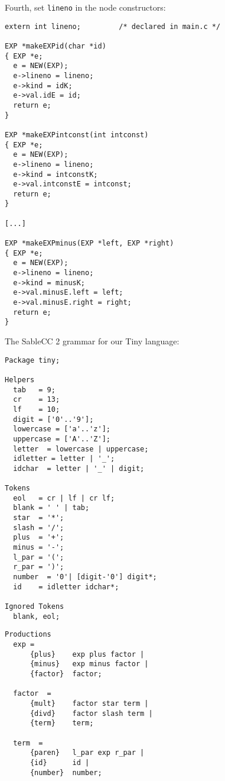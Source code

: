 \begin{slide*}
Fourth, set {\tt lineno} in the node constructors:
 
\begin{scriptsize}
\begin{verbatim}
extern int lineno;         /* declared in main.c */
 
EXP *makeEXPid(char *id)
{ EXP *e;
  e = NEW(EXP);
  e->lineno = lineno;
  e->kind = idK;
  e->val.idE = id;
  return e;
}
 
EXP *makeEXPintconst(int intconst)
{ EXP *e;
  e = NEW(EXP);
  e->lineno = lineno;
  e->kind = intconstK;
  e->val.intconstE = intconst;
  return e;
}

[...]

EXP *makeEXPminus(EXP *left, EXP *right)
{ EXP *e;
  e = NEW(EXP);
  e->lineno = lineno;
  e->kind = minusK;
  e->val.minusE.left = left;
  e->val.minusE.right = right;
  return e;
}
\end{verbatim}
\end{scriptsize}
\vfil
\end{slide*}
 
\begin{slide*}
The SableCC 2 grammar for our Tiny language:
\begin{scriptsize}
\begin{verbatim}
Package tiny;

Helpers
  tab   = 9;
  cr    = 13;
  lf    = 10;
  digit = ['0'..'9'];
  lowercase = ['a'..'z'];
  uppercase = ['A'..'Z'];
  letter  = lowercase | uppercase;
  idletter = letter | '_';
  idchar  = letter | '_' | digit;

Tokens
  eol   = cr | lf | cr lf;
  blank = ' ' | tab;
  star  = '*';
  slash = '/';
  plus  = '+';
  minus = '-';
  l_par = '(';
  r_par = ')';
  number  = '0'| [digit-'0'] digit*;
  id    = idletter idchar*;

Ignored Tokens
  blank, eol;
\end{verbatim}
\end{scriptsize}
\vfil
\end{slide*}

\begin{slide*}
\begin{scriptsize}
\begin{verbatim}
Productions
  exp = 
      {plus}    exp plus factor |
      {minus}   exp minus factor |
      {factor}  factor;

  factor  =
      {mult}    factor star term |
      {divd}    factor slash term |
      {term}    term;

  term  =
      {paren}   l_par exp r_par |
      {id}      id |
      {number}  number;
\end{verbatim}
\end{scriptsize}
\vfil
\end{slide*}


